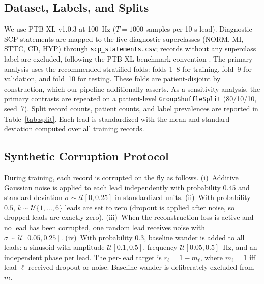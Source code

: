 
\subsection{Dataset, Labels, and Splits}
\label{subsec:data}
We use PTB-XL v1.0.3 \cite{wagner2020ptb} at 100~Hz ($T=1000$ samples per 10-s lead). Diagnostic SCP statements are mapped to the five diagnostic superclasses (NORM, MI, STTC, CD, HYP) through \texttt{scp\_statements.csv}; records without any superclass label are excluded, following the PTB-XL benchmark convention \cite{strodthoff2020deep}. The primary analysis uses the recommended stratified folds: folds 1--8 for training, fold~9 for validation, and fold~10 for testing. These folds are patient-disjoint by construction, which our pipeline additionally asserts. As a sensitivity analysis, the primary contrasts are repeated on a patient-level \texttt{GroupShuffleSplit} (80/10/10, seed~7). Split record counts, patient counts, and label prevalences are reported in Table~\ref{tab:split}. Each lead is standardized with the mean and standard deviation computed over all training records.

\subsection{Synthetic Corruption Protocol}
\label{subsec:corruption}
During training, each record is corrupted on the fly as follows. (i)~Additive Gaussian noise is applied to each lead independently with probability $0.45$ and standard deviation $\sigma\sim\mathcal{U}[0,0.25]$ in standardized units. (ii)~With probability $0.5$, $k\sim\mathcal{U}\{1,\dots,6\}$ leads are set to zero (dropout is applied after noise, so dropped leads are exactly zero). (iii)~When the reconstruction loss is active and no lead has been corrupted, one random lead receives noise with $\sigma\sim\mathcal{U}[0.05,0.25]$. (iv)~With probability $0.3$, baseline wander is added to all leads: a sinusoid with amplitude $\mathcal{U}[0.1,0.5]$, frequency $\mathcal{U}[0.05,0.5]$~Hz, and an independent phase per lead. The per-lead target is $r_\ell=1-m_\ell$, where $m_\ell=1$ iff lead $\ell$ received dropout or noise. Baseline wander is deliberately excluded from $m$.


